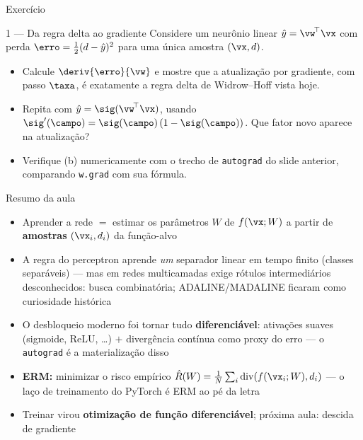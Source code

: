 \documentclass[aspectratio=169, 11pt]{beamer}
\newcommand{\dive}{\operatorname{div}}   %
\begin{document}
\begin{frame}{Exercício}
  \begin{exbox}{1 — Da regra delta ao gradiente}
    Considere um neurônio linear $\hat{y} = \vw^{\!\top}\vx$ com perda
    $\erro = \tfrac{1}{2}(d - \hat{y})^2$ para uma única amostra
    $(\vx, d)$.
    \begin{itemize}\setlength{\itemsep}{0.2ex}
      \item[(a)] Calcule $\deriv{\erro}{\vw}$ e mostre que a atualização por
                 gradiente, com passo $\taxa$, é exatamente a regra delta
                 de Widrow--Hoff vista hoje.
      \item[(b)] Repita com $\hat{y} = \sig(\vw^{\!\top}\vx)$, usando
                 $\sig'(\campo) = \sig(\campo)\,(1 - \sig(\campo))$. Que fator novo
                 aparece na atualização?
      \item[(c)] Verifique (b) numericamente com o trecho de
                 \texttt{autograd} do slide anterior, comparando
                 \texttt{w.grad} com sua fórmula.
    \end{itemize}
  \end{exbox}
\end{frame}

\begin{frame}{Resumo da aula}
  \begin{itemize}\setlength{\itemsep}{0.45ex}
    \item Aprender a rede $=$ estimar os parâmetros $W$ de $f(\vx; W)$ a partir
          de \textbf{amostras} $(\vx_i, d_i)$ da função-alvo
    \item A regra do perceptron aprende \emph{um} separador linear em tempo
          finito (classes separáveis) — mas em redes multicamadas exige
          rótulos intermediários desconhecidos: \alert{busca combinatória};
          ADALINE/MADALINE ficaram como curiosidade histórica
    \item O desbloqueio moderno foi tornar tudo \textbf{diferenciável}:
          ativações suaves (sigmoide, ReLU, \ldots) $+$ divergência contínua
          como proxy do erro — o \texttt{autograd} é a materialização disso
    \item \textbf{ERM:} minimizar o risco empírico
          $\hat{R}(W) = \frac{1}{N}\sum_i \dive(f(\vx_i; W), d_i)$ — o laço de
          treinamento do PyTorch é ERM ao pé da letra
    \item Treinar virou \textbf{otimização de função diferenciável};
          próxima aula: descida de gradiente
  \end{itemize}
\end{frame}
\end{document}
